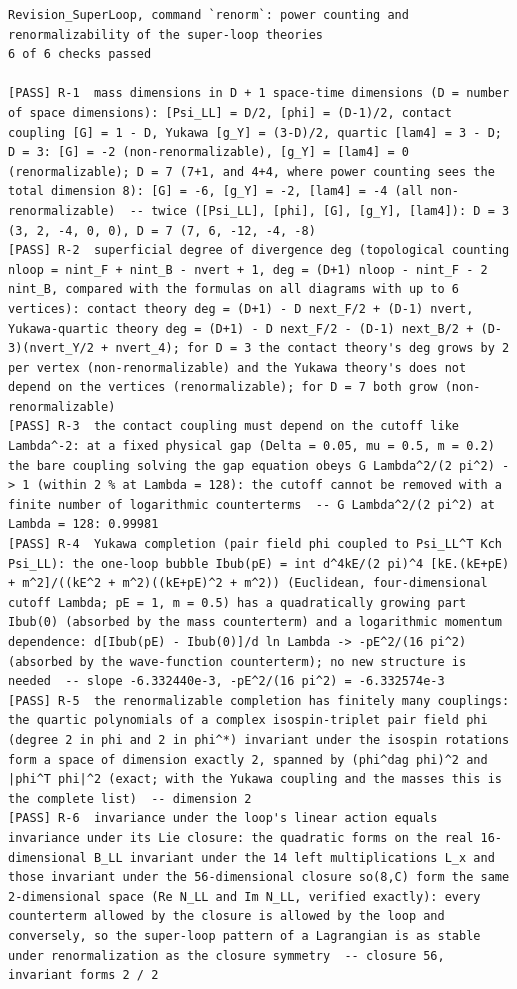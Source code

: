 \documentclass[
  10pt,
]{article}
\begin{document}
\begin{verbatim}
Revision_SuperLoop, command `renorm`: power counting and renormalizability of the super-loop theories
6 of 6 checks passed

[PASS] R-1  mass dimensions in D + 1 space-time dimensions (D = number of space dimensions): [Psi_LL] = D/2, [phi] = (D-1)/2, contact coupling [G] = 1 - D, Yukawa [g_Y] = (3-D)/2, quartic [lam4] = 3 - D; D = 3: [G] = -2 (non-renormalizable), [g_Y] = [lam4] = 0 (renormalizable); D = 7 (7+1, and 4+4, where power counting sees the total dimension 8): [G] = -6, [g_Y] = -2, [lam4] = -4 (all non-renormalizable)  -- twice ([Psi_LL], [phi], [G], [g_Y], [lam4]): D = 3 (3, 2, -4, 0, 0), D = 7 (7, 6, -12, -4, -8)
[PASS] R-2  superficial degree of divergence deg (topological counting nloop = nint_F + nint_B - nvert + 1, deg = (D+1) nloop - nint_F - 2 nint_B, compared with the formulas on all diagrams with up to 6 vertices): contact theory deg = (D+1) - D next_F/2 + (D-1) nvert, Yukawa-quartic theory deg = (D+1) - D next_F/2 - (D-1) next_B/2 + (D-3)(nvert_Y/2 + nvert_4); for D = 3 the contact theory's deg grows by 2 per vertex (non-renormalizable) and the Yukawa theory's does not depend on the vertices (renormalizable); for D = 7 both grow (non-renormalizable)
[PASS] R-3  the contact coupling must depend on the cutoff like Lambda^-2: at a fixed physical gap (Delta = 0.05, mu = 0.5, m = 0.2) the bare coupling solving the gap equation obeys G Lambda^2/(2 pi^2) -> 1 (within 2 % at Lambda = 128): the cutoff cannot be removed with a finite number of logarithmic counterterms  -- G Lambda^2/(2 pi^2) at Lambda = 128: 0.99981
[PASS] R-4  Yukawa completion (pair field phi coupled to Psi_LL^T Kch Psi_LL): the one-loop bubble Ibub(pE) = int d^4kE/(2 pi)^4 [kE.(kE+pE) + m^2]/((kE^2 + m^2)((kE+pE)^2 + m^2)) (Euclidean, four-dimensional cutoff Lambda; pE = 1, m = 0.5) has a quadratically growing part Ibub(0) (absorbed by the mass counterterm) and a logarithmic momentum dependence: d[Ibub(pE) - Ibub(0)]/d ln Lambda -> -pE^2/(16 pi^2) (absorbed by the wave-function counterterm); no new structure is needed  -- slope -6.332440e-3, -pE^2/(16 pi^2) = -6.332574e-3
[PASS] R-5  the renormalizable completion has finitely many couplings: the quartic polynomials of a complex isospin-triplet pair field phi (degree 2 in phi and 2 in phi^*) invariant under the isospin rotations form a space of dimension exactly 2, spanned by (phi^dag phi)^2 and |phi^T phi|^2 (exact; with the Yukawa coupling and the masses this is the complete list)  -- dimension 2
[PASS] R-6  invariance under the loop's linear action equals invariance under its Lie closure: the quadratic forms on the real 16-dimensional B_LL invariant under the 14 left multiplications L_x and those invariant under the 56-dimensional closure so(8,C) form the same 2-dimensional space (Re N_LL and Im N_LL, verified exactly): every counterterm allowed by the closure is allowed by the loop and conversely, so the super-loop pattern of a Lagrangian is as stable under renormalization as the closure symmetry  -- closure 56, invariant forms 2 / 2
\end{verbatim}
\end{document}
